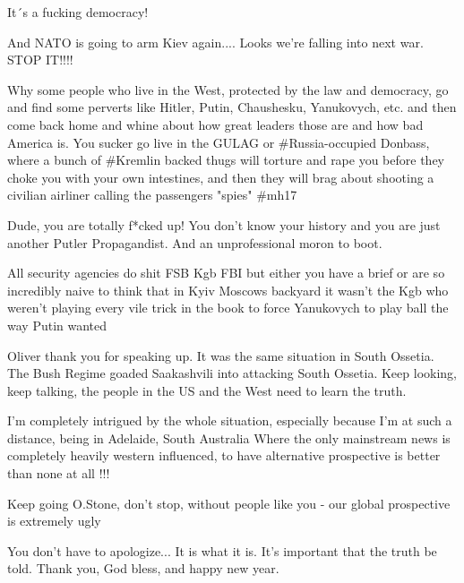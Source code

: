 \begin{itemize}
\begin{itemize} %
It´s a fucking democracy!

And NATO is going to arm Kiev again.... Looks we're falling into next war. STOP IT!!!!
\end{itemize} %


Why some people who live in the West, protected by the law and democracy, go
and find some perverts like Hitler, Putin, Chaushesku, Yanukovych, etc. and
then come back home and whine about how great leaders those are and how bad
America is. You sucker go live in the GULAG or \#Russia-occupied Donbass, where
a bunch of \#Kremlin backed thugs will torture and rape you before they choke
you with your own intestines, and then they will brag about shooting a civilian
airliner calling the passengers "spies" \#mh17


Dude, you are totally f*cked up! You don't know your history and you are just
another Putler Propagandist. And an unprofessional moron to boot.


All security agencies do shit FSB Kgb FBI but either you have a brief or are so
incredibly naive to think that in Kyiv Moscows backyard it wasn't the Kgb who
weren't playing every vile trick in the book to force Yanukovych to play ball
the way Putin wanted


Oliver thank you for speaking up. It was the same situation in South Ossetia.
The Bush Regime goaded Saakashvili into attacking South Ossetia. Keep looking,
keep talking, the people in the US and the West need to learn the truth.


I'm completely intrigued by the whole situation, especially because I'm at such
a distance, being in Adelaide, South Australia Where the only mainstream news
is completely heavily western influenced, to have alternative prospective is
better than none at all !!!

Keep going O.Stone, don't stop, without people like you - our global
prospective is extremely ugly


You don't have to apologize... It is what it is. It's important that the truth
be told. Thank you, God bless, and happy new year.


\end{itemize}

